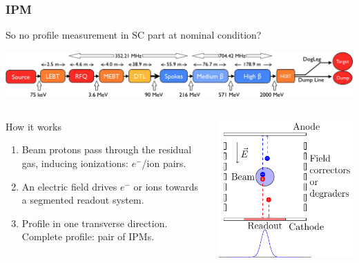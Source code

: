 \begin{frame}
  \frametitle{IPM}
  \begin{alertblock}{So no profile measurement in SC part at nominal condition?}

  \end{alertblock}
  \includegraphics[width=\textwidth]{01_Neutron/fig/fig000_ESS_acc}

  \begin{columns}
    \begin{column}{0.45\textwidth}
      \begin{block}{How it works}
        \begin{enumerate}
          \item Beam protons pass through the residual gas, inducing ionizations: $e^-$/ion pairs.
          \item An electric field drives $e^-$ or ions towards a segmented readout system.
          \item Profile in one transverse direction. Complete profile: pair of IPMs.
        \end{enumerate}
      \end{block}
    \end{column}
    \begin{column}{0.45\textwidth}
      \includegraphics[width=\textwidth]{02_ESS/fig/fig000_IPM.pdf}
    \end{column}
  \end{columns}
\end{frame}

